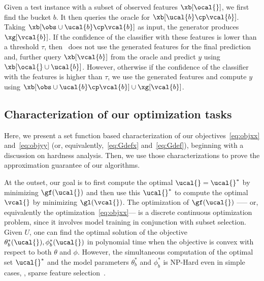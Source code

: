 \documentclass[letterpaper]{article}
\renewcommand{\cite}{\citep}
\begin{document}

 Given a test instance with a subset of observed features $\xb[\ocal{}]$, we first find the bucket $b$.
It then queries the oracle for $\xb[\ucal{b}\cp \vcal{b}]$. Taking $\xb[\obs \cup \ucal{b}\cp \vcal{b}]$ as input, the generator produces $\xg[\vcal{b}]$.
If the confidence of the classifier with these features  is lower than a threshold $\tau$, then \our\ does not use the generated features for the final prediction and, further query  $\xb[\vcal{b}]$
from the oracle and predict $y$ using $\xb[\ocal{}\cup \ucal{b}]$.
However, otherwise if the confidence of the classifier with the features is higher than $\tau$, we use the generated features and compute $y$ using $\xb[\obs\cup  \ucal{b} \cp \vcal{b}]\cup \xg[\vcal{b}]$.

 \subsection{Characterization of our optimization tasks}
 Here, we present a set function based characterization of our objectives~\eqref{eq:objxx} and~\eqref{eq:objyy} (or, equivalently,~\eqref{eq:Gdefx} and~\eqref{eq:Gdef}), beginning with a discussion on hardness analysis. Then, we use those characterizations to prove the approximation guarantee of our algorithms.

 At the outset, our goal is to first compute the optimal $\ucal{} = \ucal{}^*$ by minimizing $\gf(\ucal{})$
and then use this $\ucal{}^*$ to compute the optimal $\vcal{}$ by minimizing $\gl(\vcal{})$.
The optimization of $\gf(\ucal{})$ ----- or, equivalently the optimization~\eqref{eq:objxx}--- is a discrete continuous optimization problem, since it involves model training in conjunction with subset selection.
 Given $U$, one can find the optimal solution of the objective $\theta_b ^*(\ucal{}), \phi_b ^*(\ucal{})$ in polynomial time when the objective is convex with respect to both $\theta$ and $\phi$.
However, the simultaneous computation of
the optimal set $\ucal{} ^*$ and the model parameters $\theta_b ^*$ and $\phi_b ^*$
is NP-Hard even in simple cases, \eg,
sparse feature selection~\cite{elenberg2018restricted}.
\end{document}
